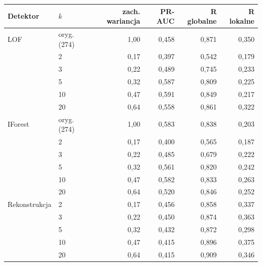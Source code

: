\begin{tabular}{llrrrr}
\toprule
Detektor & $k$ & zach. wariancja & PR-AUC & R globalne & R lokalne \\
\midrule
LOF & oryg. (274) & 1,00 & 0,458 & 0,871 & 0,350 \\
 & 2 & 0,17 & 0,397 & 0,542 & 0,179 \\
 & 3 & 0,22 & 0,489 & 0,745 & 0,233 \\
 & 5 & 0,32 & 0,587 & 0,809 & 0,225 \\
 & 10 & 0,47 & 0,591 & 0,849 & 0,217 \\
 & 20 & 0,64 & 0,558 & 0,861 & 0,322 \\
IForest & oryg. (274) & 1,00 & 0,583 & 0,838 & 0,203 \\
 & 2 & 0,17 & 0,400 & 0,565 & 0,187 \\
 & 3 & 0,22 & 0,485 & 0,679 & 0,222 \\
 & 5 & 0,32 & 0,561 & 0,820 & 0,242 \\
 & 10 & 0,47 & 0,582 & 0,833 & 0,263 \\
 & 20 & 0,64 & 0,520 & 0,846 & 0,252 \\
Rekonstrukcja & 2 & 0,17 & 0,456 & 0,858 & 0,337 \\
 & 3 & 0,22 & 0,450 & 0,874 & 0,363 \\
 & 5 & 0,32 & 0,432 & 0,872 & 0,298 \\
 & 10 & 0,47 & 0,415 & 0,896 & 0,375 \\
 & 20 & 0,64 & 0,415 & 0,909 & 0,346 \\
\bottomrule
\end{tabular}
